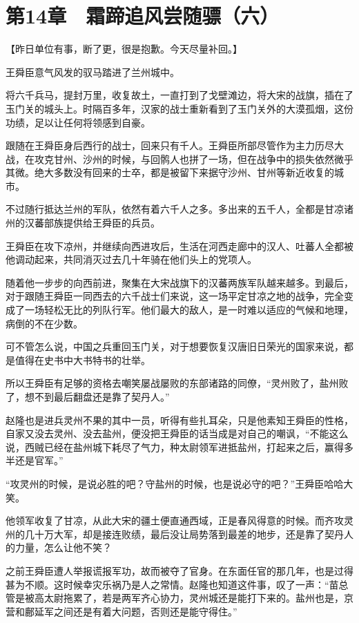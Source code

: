 \section{第14章　霜蹄追风尝随骠（六）}

【昨日单位有事，断了更，很是抱歉。今天尽量补回。】

王舜臣意气风发的驭马踏进了兰州城中。

将六千兵马，提封万里，收复故土，一直打到了戈壁滩边，将大宋的战旗，插在了玉门关的城头上。时隔百多年，汉家的战士重新看到了玉门关外的大漠孤烟，这份功绩，足以让任何将领感到自豪。

跟随在王舜臣身后西行的战士，回来只有千人。王舜臣所部尽管作为主力历尽大战，在攻克甘州、沙州的时候，与回鹘人也拼了一场，但在战争中的损失依然微乎其微。绝大多数没有回来的士卒，都是被留下来据守沙州、甘州等新近收复的城市。

不过随行抵达兰州的军队，依然有着六千人之多。多出来的五千人，全都是甘凉诸州的汉蕃部族提供给王舜臣的兵员。

王舜臣在攻下凉州，并继续向西进攻后，生活在河西走廊中的汉人、吐蕃人全都被他调动起来，共同消灭过去几十年骑在他们头上的党项人。

随着他一步步的向西前进，聚集在大宋战旗下的汉蕃两族军队越来越多。到最后，对于跟随王舜臣一同西去的六千战士们来说，这一场平定甘凉之地的战争，完全变成了一场轻松无比的列队行军。他们最大的敌人，是一时难以适应的气候和地理，病倒的不在少数。

可不管怎么说，中国之兵重回玉门关，对于想要恢复汉唐旧日荣光的国家来说，都是值得在史书中大书特书的壮举。

所以王舜臣有足够的资格去嘲笑屡战屡败的东部诸路的同僚，“灵州败了，盐州败了，想不到最后翻盘还是靠了契丹人。”

赵隆也是进兵灵州不果的其中一员，听得有些扎耳朵，只是他素知王舜臣的性格，自家又没去灵州、没去盐州，便没把王舜臣的话当成是对自己的嘲讽，“不能这么说，西贼已经在盐州城下耗尽了气力，种太尉领军进抵盐州，打起来之后，赢得多半还是官军。”

“攻灵州的时候，是说必胜的吧？守盐州的时候，也是说必守的吧？”王舜臣哈哈大笑。

他领军收复了甘凉，从此大宋的疆土便直通西域，正是春风得意的时候。而齐攻灵州的几十万大军，却是接连败绩，最后没让局势落到最差的地步，还是靠了契丹人的力量，怎么让他不笑？

之前王舜臣遭人举报谎报军功，故而被夺了官身。在东面任官的那几年，也是过得甚为不顺。这时候幸灾乐祸乃是人之常情。赵隆也知道这件事，叹了一声：“苗总管是被高太尉拖累了，若是两军齐心协力，灵州城还是能打下来的。盐州也是，京营和鄜延军之间还是有着大问题，否则还是能守得住。”

